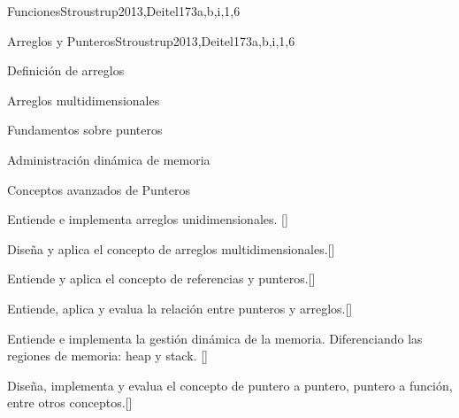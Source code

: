\begin{syllabus}
\begin{unit}{Funciones}{}{Stroustrup2013,Deitel17}{3}{a,b,i,1,6}
\begin{learningoutcomes}
    \end{learningoutcomes}
\end{unit}

\begin{unit}{Arreglos y Punteros}{}{Stroustrup2013,Deitel17}{3}{a,b,i,1,6}
    \begin{topics}
       \item Definición de arreglos
        \item Arreglos multidimensionales
        \item Fundamentos sobre punteros
        \item Administración dinámica de memoria 
        \item Conceptos avanzados de Punteros 
    \end{topics}
    \begin{learningoutcomes}
       \item  Entiende e implementa arreglos unidimensionales. [\Familiarity]
        \item  Diseña y aplica el concepto de arreglos multidimensionales.[\Usage]
        \item  Entiende y aplica el concepto de referencias y punteros.[\Familiarity]
        \item  Entiende, aplica y evalua la relación entre punteros y arreglos.[\Assessment]
        \item  Entiende e implementa la gestión dinámica de la memoria. Diferenciando las regiones de memoria: heap y stack. [\Assessment]
        \item  Diseña, implementa y evalua el concepto de puntero a puntero, puntero a función, entre otros conceptos.[\Assessment]
    \end{learningoutcomes}
\end{unit}


\end{syllabus}
